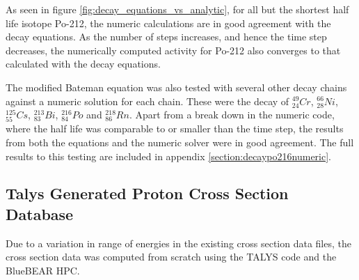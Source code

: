 As seen in figure \ref{fig:decay_equations_vs_analytic}, for all but the shortest half life isotope Po-212, the numeric calculations are in good agreement with the decay equations.  As the number of steps increases, and hence the time step decreases, the numerically computed activity for Po-212 also converges to that calculated with the decay equations.

The modified Bateman equation was also tested with several other decay chains against a numeric solution for each chain.  These were the decay of ${}^{49}_{24}Cr$, ${}^{66}_{28}Ni$, ${}^{125}_{55}Cs$, ${}^{213}_{83}Bi$, ${}^{216}_{84}Po$ and ${}^{218}_{86}Rn$.  Apart from a break down in the numeric code, where the half life was comparable to or smaller than the time step, the results from both the equations and the numeric solver were in good agreement.  The full results to this testing are included in appendix \ref{section:decaypo216numeric}.




\FloatBarrier
\subsection{Talys Generated Proton Cross Section Database}
\label{section:activitytalysdb}

Due to a variation in range of energies in the existing cross section data files, the cross section data was computed from scratch using the TALYS code and the BlueBEAR HPC.


